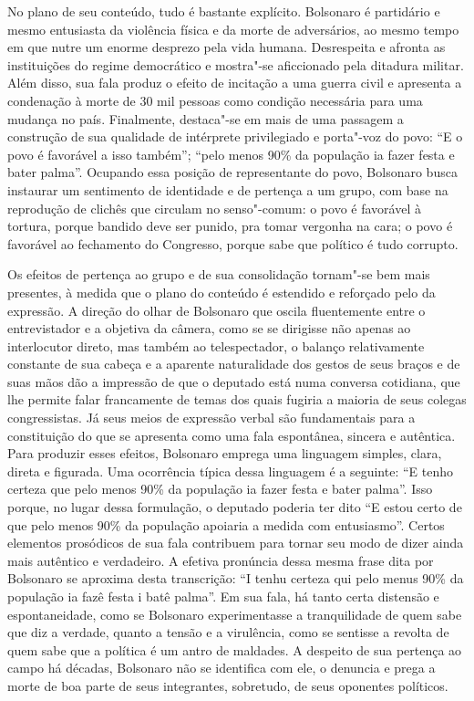 No plano de seu conteúdo, tudo é bastante explícito. Bolsonaro é
partidário e mesmo entusiasta da violência física e da morte de
adversários, ao mesmo tempo em que nutre um enorme desprezo pela vida
humana. Desrespeita e afronta as instituições do regime democrático e
mostra"-se aficcionado pela ditadura militar. Além disso, sua fala produz
o efeito de incitação a uma guerra civil e apresenta a condenação à
morte de 30 mil pessoas como condição necessária para uma mudança no
país. Finalmente, destaca"-se em mais de uma passagem a construção de sua
qualidade de intérprete privilegiado e porta"-voz do povo: ``E o povo é
favorável a isso também''; ``pelo menos 90\% da população ia fazer festa
e bater palma''. Ocupando essa posição de representante do povo,
Bolsonaro busca instaurar um sentimento de identidade e de pertença a um
grupo, com base na reprodução de clichês que circulam no senso"-comum: o
povo é favorável à tortura, porque bandido deve ser punido, pra tomar
vergonha na cara; o povo é favorável ao fechamento do Congresso, porque
sabe que político é tudo corrupto.

Os efeitos de pertença ao grupo e de sua consolidação tornam"-se bem mais
presentes, à medida que o plano do conteúdo é estendido e reforçado pelo
da expressão. A direção do olhar de Bolsonaro que oscila fluentemente
entre o entrevistador e a objetiva da câmera, como se se dirigisse não
apenas ao interlocutor direto, mas também ao telespectador, o balanço
relativamente constante de sua cabeça e a aparente naturalidade dos
gestos de seus braços e de suas mãos dão a impressão de que o deputado
está numa conversa cotidiana, que lhe permite falar francamente de temas
dos quais fugiria a maioria de seus colegas congressistas. Já seus meios
de expressão verbal são fundamentais para a constituição do que se
apresenta como uma fala espontânea, sincera e autêntica. Para produzir
esses efeitos, Bolsonaro emprega uma linguagem simples, clara, direta e
figurada. Uma ocorrência típica dessa linguagem é a seguinte: ``E tenho
certeza que pelo menos 90\% da população ia fazer festa e bater palma''.
Isso porque, no lugar dessa formulação, o deputado poderia ter dito ``E
estou certo de que pelo menos 90\% da população apoiaria a medida com
entusiasmo''. Certos elementos prosódicos de sua fala contribuem para
tornar seu modo de dizer ainda mais autêntico e verdadeiro. A efetiva
pronúncia dessa mesma frase dita por Bolsonaro se aproxima desta
transcrição: ``I tenhu certeza qui pelo menus 90\% da população ia fazê
festa i batê palma''. Em sua fala, há tanto certa distensão e
espontaneidade, como se Bolsonaro experimentasse a tranquilidade de quem
sabe que diz a verdade, quanto a tensão e a virulência, como se sentisse
a revolta de quem sabe que a política é um antro de maldades. A despeito
de sua pertença ao campo há décadas, Bolsonaro não se identifica com
ele, o denuncia e prega a morte de boa parte de seus integrantes,
sobretudo, de seus oponentes políticos.

